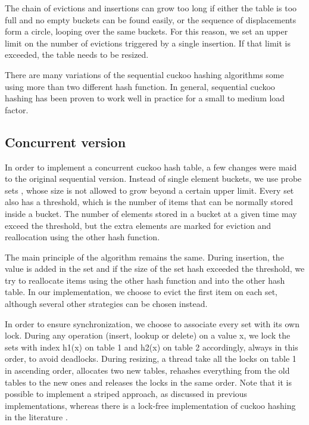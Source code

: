 The chain of evictions and insertions can grow too long if either the table is too full and no empty buckets can be found easily, or the sequence of displacements form a circle, looping over the same buckets. For this reason, we set an upper limit on the number of evictions triggered by a single insertion. If that limit is exceeded, the table needs to be resized.

There are many variations of the sequential cuckoo hashing algorithms some using more than two different hash function. In general, sequential cuckoo hashing has been proven to work well in practice for a small  to medium load factor.

\subsection{Concurrent version}

In order to implement a concurrent cuckoo hash table, a few changes were maid to the original sequential version. Instead of single element buckets, we use probe sets , whose size is not allowed to grow beyond a certain upper limit. Every set also has a threshold, which is the number of items that can be normally stored inside a bucket. The number of elements stored in a bucket at a given time may exceed the threshold, but the extra elements are marked for eviction and reallocation using the other hash function.

The main principle of the algorithm remains the same. During insertion, the value is added in the set and if the size of the set hash exceeded the threshold, we try to reallocate items using the other hash function and into the other hash table.  In our implementation, we choose to evict the first item on each set, although several other strategies can be chosen instead.

In order to ensure synchronization, we choose to associate every set with its own lock. During any operation (insert, lookup or delete) on a value x, we lock the sets with index h1(x) on table 1 and h2(x) on table 2 accordingly, always in this order, to avoid deadlocks. During resizing, a thread take all the locks on table 1 in ascending order, allocates two new tables, rehashes everything from the old tables to the new ones and releases the locks in the same order. Note that it is possible to implement a striped approach, as discussed in previous implementations, whereas there is a lock-free implementation of cuckoo hashing in the literature \cite{lock_free_cuckoo}.

